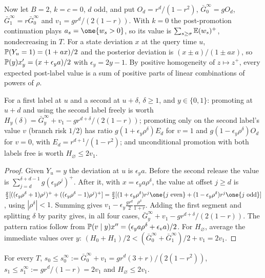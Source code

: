 Now let $B=2$, $k=c=0$, $d$ odd, and put $O_d=r^d/(1-r^2)$, $\bar G_0^\infty=gO_d$, $\bar G_1^\infty=r\bar G_0^\infty$ and $v_1=gr^d/(2(1-r))$. With $k=0$ the post-promotion continuation plays $a_s=\one\{w_s>0\}$, so its value is $\sum_{s\ge\sigma}\mathbb{E}(w_s)^+$, nondecreasing in $T$. For a state deviation $x$ at the query time $u$, $\mathbb{P}(Y_u=1)=(1+ax)/2$ and the posterior deviation is $(x\pm a)/(1\pm ax)$, so $\mathbb{P}(y)x'_y=(x+\epsilon_ya)/2$ with $\epsilon_y=2y-1$. By positive homogeneity of $z\mapsto z^+$, every expected post-label value is a sum of positive parts of linear combinations of powers of $\rho$.

\begin{lemma}[$T=\infty$ branch values]
\label{lem:M41}
For a first label at $u$ and a second at $u+\delta$, $\delta\ge1$, and $y\in\{0,1\}$: promoting at $u+d$ and using the second label freely is worth $H_y(\delta)=\bar G_y^\infty+v_1-gr^{d+\delta}/(2(1-r))$; promoting only on the second label's value $v$ (branch risk $1/2$) has ratio $g(1+\epsilon_y\rho^\delta)E_d$ for $v=1$ and $g(1-\epsilon_y\rho^\delta)O_d$ for $v=0$, with $E_d=r^{d+1}/(1-r^2)$; and unconditional promotion with both labels free is worth $H_\varnothing\le2v_1$.
\end{lemma}

\begin{proof}
Given $Y_u=y$ the deviation at $u$ is $\epsilon_ya$. Before the second release the value is $\sum_{j=d}^{\delta+d-1}g(\epsilon_y\rho^j)^+$. After it, with $x=\epsilon_ya\rho^\delta$, the value at offset $j\ge d$ is $\tfrac g2[((\epsilon_y\rho^\delta+1)\rho^j)^++((\epsilon_y\rho^\delta-1)\rho^j)^+]=\tfrac g2[(1+\epsilon_y\rho^\delta)r^j\one\{j\text{ even}\}+(1-\epsilon_y\rho^\delta)r^j\one\{j\text{ odd}\}]$, using $|\rho^\delta|<1$. Summing gives $v_1-\epsilon_y\tfrac{gr^d}{2}\tfrac{\rho^\delta}{1+r}$. Adding the first segment and splitting $\delta$ by parity gives, in all four cases, $\bar G_y^\infty+v_1-gr^{d+\delta}/(2(1-r))$. The pattern ratios follow from $\mathbb{P}(v\mid y)x''=(\epsilon_ya\rho^\delta+\epsilon_va)/2$. For $H_\varnothing$, average the immediate values over $y$: $(H_0+H_1)/2<(\bar G_0^\infty+\bar G_1^\infty)/2+v_1=2v_1$.
\end{proof}

\begin{lemma}[Branch slopes at $B=2$]
\label{lem:M42}
For every $T$, $s_0\le s_0^\infty:=\bar G_0^\infty+v_1=gr^d(3+r)/(2(1-r^2))$, $s_1\le s_1^\infty:=gr^d/(1-r)=2v_1$ and $H_\varnothing\le2v_1$.
\end{lemma}

